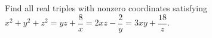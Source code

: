 Find all real triples with nonzero coordinates satisfying $x^2+y^2+z^2=yz+\dfrac{8}{x}=2xz-\dfrac{2}{y}=3xy+\dfrac{18}{z}$.
